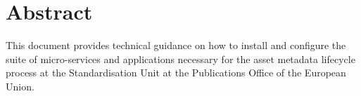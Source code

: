\section*{Abstract}

	This document provides technical guidance on how to install and configure the suite of micro-services and applications necessary for the asset metadata lifecycle process at the Standardisation Unit at the Publications Office of the European Union. 
	
	
